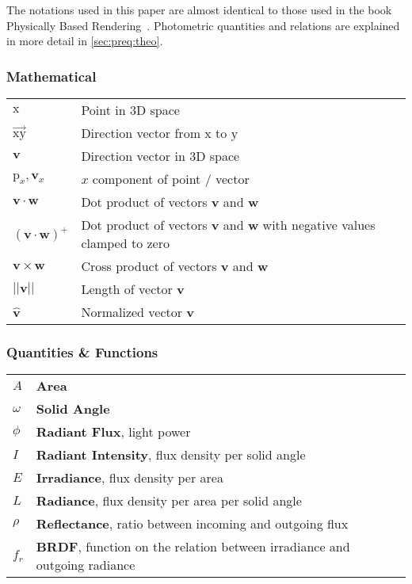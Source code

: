\documentclass[thesis.tex]{subfiles}
\begin{document}

The notations used in this paper are almost identical to those used in the book Physically Based Rendering~\cite{bib:pbrt}. Photometric quantities and relations are explained in more detail in \autoref{sec:preq:theo}.

\subsubsection*{Mathematical}

\begin{tabular}{ l l }
$\mathrm{x}$ & Point in 3D space \\
$\overrightarrow{\mathrm{x}\mathrm{y}}$ & Direction vector from $\mathrm{x}$ to $\mathrm{y}$\\
$\mathbf{v}$ & Direction vector in 3D space \\
$\mathrm{p}_x, \mathbf{v}_x$ & $x$ component of point / vector\\
$\mathbf{v} \cdot \mathbf{w}$ & Dot product of vectors $\mathbf{v}$ and $\mathbf{w}$\\
$(\mathbf{v} \cdot \mathbf{w})^+$ & Dot product of vectors $\mathbf{v}$ and $\mathbf{w}$ with negative values clamped to zero\\
$\mathbf{v} \times \mathbf{w}$ & Cross product of vectors $\mathbf{v}$ and $\mathbf{w}$\\
$||\mathbf{v}||$ & Length of vector $\mathbf{v}$\\
$\hat{\mathbf{v}}$ & Normalized vector $\mathbf{v}$
\end{tabular}


\subsubsection*{Quantities \& Functions}

\begin{tabular}{ l l l}
$A$ & \textbf{Area}\\
$\omega$ & \textbf{Solid Angle}\\
$\phi$ & \textbf{Radiant Flux}, light power\\
$I$ & \textbf{Radiant Intensity}, flux density per solid angle\\
$E$ & \textbf{Irradiance}, flux density per area\\
$L$ & \textbf{Radiance}, flux density per area per solid angle\\
$\rho$ & \textbf{Reflectance}, ratio between incoming and outgoing flux\\
$f_r$ & \textbf{BRDF}, function on the relation between irradiance and outgoing radiance\\
\end{tabular}
\end{document}

